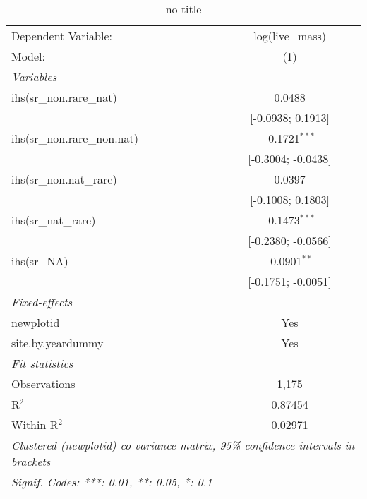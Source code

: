 
\begin{table}[htbp]
   \caption{no title}
   \centering
   \begin{tabular}{lc}
      \tabularnewline \midrule \midrule
      Dependent Variable:          & log(live\_mass)\\   
      Model:                       & (1)\\  
      \midrule
      \emph{Variables}\\
      ihs(sr\_non.rare\_nat)       & 0.0488\\   
                                   & [-0.0938; 0.1913]\\   
      ihs(sr\_non.rare\_non.nat)   & -0.1721$^{***}$\\   
                                   & [-0.3004; -0.0438]\\   
      ihs(sr\_non.nat\_rare)       & 0.0397\\   
                                   & [-0.1008; 0.1803]\\   
      ihs(sr\_nat\_rare)           & -0.1473$^{***}$\\   
                                   & [-0.2380; -0.0566]\\   
      ihs(sr\_NA)                  & -0.0901$^{**}$\\   
                                   & [-0.1751; -0.0051]\\   
      \midrule
      \emph{Fixed-effects}\\
      newplotid                    & Yes\\  
      site.by.yeardummy            & Yes\\  
      \midrule
      \emph{Fit statistics}\\
      Observations                 & 1,175\\  
      R$^2$                        & 0.87454\\  
      Within R$^2$                 & 0.02971\\  
      \midrule \midrule
      \multicolumn{2}{l}{\emph{Clustered (newplotid) co-variance matrix, 95\% confidence intervals in brackets}}\\
      \multicolumn{2}{l}{\emph{Signif. Codes: ***: 0.01, **: 0.05, *: 0.1}}\\
   \end{tabular}
\end{table}


